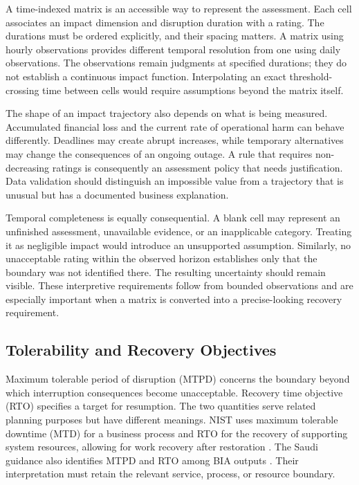 A time-indexed matrix is an accessible way to represent the assessment. Each cell associates an impact dimension and disruption duration with a rating. The durations must be ordered explicitly, and their spacing matters. A matrix using hourly observations provides different temporal resolution from one using daily observations. The observations remain judgments at specified durations; they do not establish a continuous impact function. Interpolating an exact threshold-crossing time between cells would require assumptions beyond the matrix itself.

The shape of an impact trajectory also depends on what is being measured. Accumulated financial loss and the current rate of operational harm can behave differently. Deadlines may create abrupt increases, while temporary alternatives may change the consequences of an ongoing outage. A rule that requires non-decreasing ratings is consequently an assessment policy that needs justification. Data validation should distinguish an impossible value from a trajectory that is unusual but has a documented business explanation.

Temporal completeness is equally consequential. A blank cell may represent an unfinished assessment, unavailable evidence, or an inapplicable category. Treating it as negligible impact would introduce an unsupported assumption. Similarly, no unacceptable rating within the observed horizon establishes only that the boundary was not identified there. The resulting uncertainty should remain visible. These interpretive requirements follow from bounded observations and are especially important when a matrix is converted into a precise-looking recovery requirement.

\subsection{Tolerability and Recovery Objectives}
\label{sec:lr_parameters}

Maximum tolerable period of disruption (MTPD) concerns the boundary beyond which interruption consequences become unacceptable. Recovery time objective (RTO) specifies a target for resumption. The two quantities serve related planning purposes but have different meanings. NIST uses maximum tolerable downtime (MTD) for a business process and RTO for the recovery of supporting system resources, allowing for work recovery after restoration \cite{nist2010contingency}. The Saudi guidance also identifies MTPD and RTO among BIA outputs \cite{nrcnationalframework,dga2025guidelineen}. Their interpretation must retain the relevant service, process, or resource boundary.

